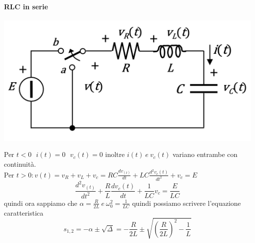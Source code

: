 \documentclass{article}
\theoremstyle{definition}
\begin{document}
\paragraph{RLC in serie}
\begin{center}
	\includegraphics[scale=0.40]{immagini/rlc}
\end{center}
Per $t < 0 \ \ \ i(t)=0 \ \ \ v_c(t)=0$  inoltre $i(t) \  e  \ v_c(t)$ variano entrambe con continuità.\\
Per $t > 0 : v(t)=v_R+v_L+v_c=RC\frac{dv_(t)}{dt}+LC\frac{d^2v_c(t)}{dt^2}+v_c=E $
$$\frac{d^2v_(t)}{dt^2}+\frac{R}{L}\frac{dv_c(t)}{dt}+\frac{1}{LC}v_c=\frac{E}{LC}$$
quindi ora sappiamo che $\alpha=\frac{R}{2L} \ e \ \omega^2_0=\frac{1}{LC}$ quindi possiamo scrivere l'equazione caratteristica 
$$s_{1,2}=-\alpha \pm \sqrt{\Delta}=-\frac{R}{2L}\pm \sqrt{\left( \frac{R}{2L}\right) ^2-\frac{1}{L}}$$
\end{document}

